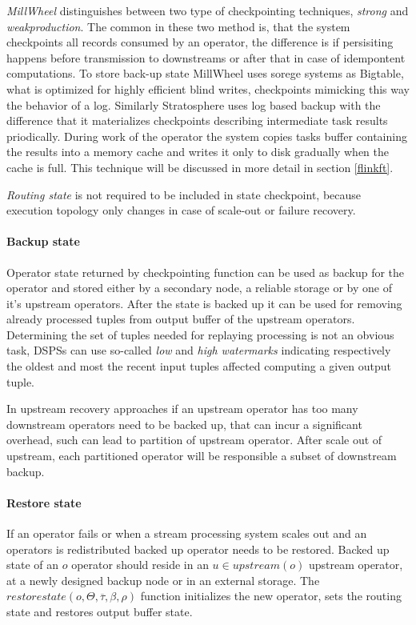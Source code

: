 \textit{MillWheel} %
distinguishes between two type of checkpointing techniques, \textit{strong} and \textit{weakproduction}. The common in these two method is, that the system checkpoints all records consumed by an operator, the difference is if persisiting happens before transmission to downstreams or after that in case of idempontent computations. To store back-up state MillWheel uses sorege systems as Bigtable\cite{bigtable}, what is optimized for highly efficient blind writes, checkpoints mimicking this way the behavior of a log.
Similarly Stratosphere uses log based backup with the difference that it  materializes checkpoints describing intermediate task results priodically. During work of the operator the system copies tasks buffer containing the results into a memory cache and writes it only to disk gradually when the cache is full. This technique will be discussed in more detail in section \ref{flinkft}. 

\textit{Routing state} is not required to be included in state checkpoint, because execution topology only changes in case of scale-out or failure recovery.


 


\paragraph{Backup state}
Operator state returned by checkpointing function can be used as backup for the operator and stored either by a secondary node, a reliable storage or by one of it's upstream operators. After the state is backed up it can be used for removing already processed tuples from output buffer of the upstream operators. 
Determining the set of tuples needed for replaying processing is not an obvious task, DSPSs can use so-called \textit{low} and \textit{high watermarks}\cite{highavailibilityalg} indicating  respectively the oldest and most the recent input tuples affected computing a given output tuple.  


In upstream recovery approaches if an upstream operator has too many downstream operators need to be backed up, that can incur a significant overhead, such can lead to partition of upstream operator. After scale out of upstream, each partitioned operator will be responsible a subset of downstream backup. 


\paragraph{Restore state}
If an operator fails or when a stream processing system scales out and an operators is redistributed backed up operator needs to be restored. Backed up state of an $o$ operator should reside in an $u \in upstream(o)$ upstream operator, at a newly designed backup node or in an external storage.  The $restorestate(o,\Theta,\overline{\tau},\beta,\rho)$ function initializes the new operator, sets the routing state and restores output buffer state.

